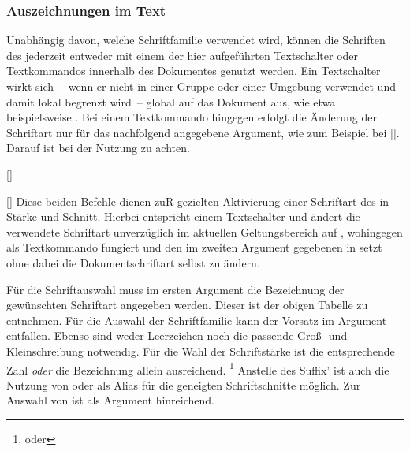 \begin{Declaration*}{}
\begin{Declaration*}{}
\begin{Declaration*}{}
\subsubsection{Auszeichnungen im Text}
%
%
%
Unabhängig davon, welche Schriftfamilie verwendet wird, können die Schriften 
des \CDs jederzeit entweder mit einem der hier aufgeführten Textschalter oder 
Textkommandos innerhalb des Dokumentes genutzt werden. Ein Textschalter wirkt 
sich~-- wenn er nicht in einer Gruppe oder einer Umgebung verwendet und damit 
lokal begrenzt wird~-- global auf das Dokument aus, wie etwa beispielsweise 
. Bei einem Textkommando hingegen erfolgt die Änderung der 
Schriftart nur für das nachfolgend angegebene Argument, wie zum Beispiel bei
[]. Darauf ist bei der Nutzung zu achten. 
%
\begin{Declaration}[v2.04]{[]}
\begin{Declaration}[v2.04]{%
  []%
}
\printdeclarationlist
Diese beiden Befehle dienen zuR gezielten Aktivierung einer Schriftart des \CDs 
in Stärke und Schnitt. Hierbei entspricht  einem Textschalter und 
ändert die verwendete Schriftart unverzüglich im aktuellen Geltungsbereich auf 
, wohingegen  als Textkommando fungiert und 
den im zweiten Argument gegebenen  in  setzt ohne 
dabei die Dokumentschriftart selbst zu ändern.

Für die Schriftauswahl muss im ersten Argument die Bezeichnung der gewünschten 
Schriftart angegeben werden. Dieser ist der obigen Tabelle zu entnehmen. Für 
die Auswahl der Schriftfamilie \Univers kann der Vorsatz  im 
Argument  entfallen. Ebenso sind weder Leerzeichen noch die 
passende Groß- und Kleinschreibung notwendig. Für die Wahl der Schriftstärke 
ist die entsprechende Zahl \emph{oder} die Bezeichnung allein ausreichend.%
\footnote{ oder }
Anstelle des Suffix'  ist auch die Nutzung von  
oder  als Alias für die geneigten Schriftschnitte möglich. Zur 
Auswahl von \DIN ist  als Argument hinreichend.
\end{Declaration}
\end{Declaration}


\end{Declaration*}
\end{Declaration*}
\end{Declaration*}
